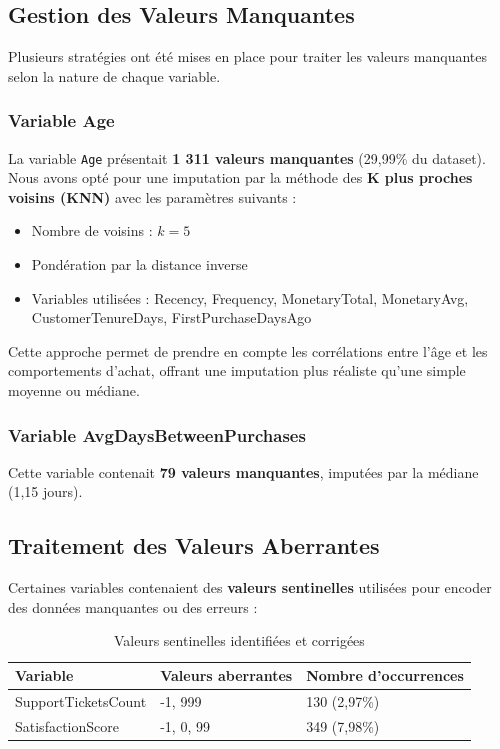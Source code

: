 \documentclass[12pt,a4paper]{article}
\begin{document}
\subsection{Gestion des Valeurs Manquantes}

Plusieurs stratégies ont été mises en place pour traiter les valeurs manquantes selon la nature de chaque variable.

\subsubsection{Variable Age}
La variable \texttt{Age} présentait \textbf{1 311 valeurs manquantes} (29,99\% du dataset). Nous avons opté pour une imputation par la méthode des \textbf{K plus proches voisins (KNN)} avec les paramètres suivants :
\begin{itemize}
    \item Nombre de voisins : $k = 5$
    \item Pondération par la distance inverse
    \item Variables utilisées : Recency, Frequency, MonetaryTotal, MonetaryAvg, CustomerTenureDays, FirstPurchaseDaysAgo
\end{itemize}

Cette approche permet de prendre en compte les corrélations entre l'âge et les comportements d'achat, offrant une imputation plus réaliste qu'une simple moyenne ou médiane.

\subsubsection{Variable AvgDaysBetweenPurchases}
Cette variable contenait \textbf{79 valeurs manquantes}, imputées par la médiane (1,15 jours).

\subsection{Traitement des Valeurs Aberrantes}

Certaines variables contenaient des \textbf{valeurs sentinelles} utilisées pour encoder des données manquantes ou des erreurs :

\begin{table}[H]
\centering
\begin{tabular}{lll}
\toprule
\textbf{Variable} & \textbf{Valeurs aberrantes} & \textbf{Nombre d'occurrences} \\
\midrule
SupportTicketsCount & -1, 999 & 130 (2,97\%) \\
SatisfactionScore & -1, 0, 99 & 349 (7,98\%) \\
\bottomrule
\end{tabular}
\caption{Valeurs sentinelles identifiées et corrigées}
\end{table}
\end{document}

